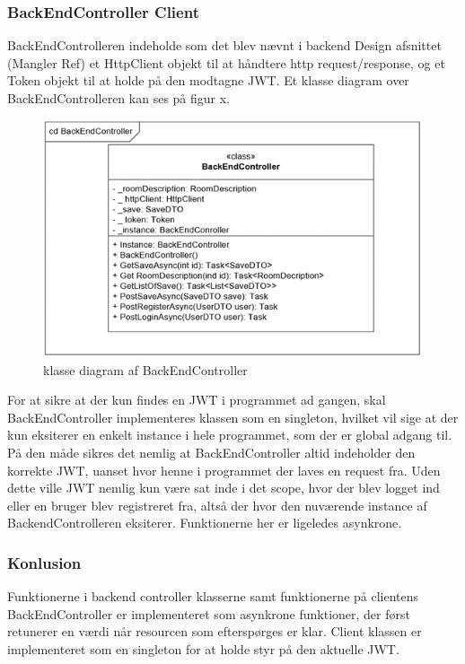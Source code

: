 \subsubsection{BackEndController Client}
BackEndControlleren indeholde som det blev nævnt i backend Design afsnittet (Mangler Ref) et HttpClient objekt til at håndtere http request/response, og et Token objekt til at holde på den modtagne JWT.
Et klasse diagram over BackEndControlleren kan ses på figur x.\\

\begin{figure}[H]
\centering
\includegraphics[width = \textwidth]{02-Body/Images/Backend_klasse_BackEndController.PNG}
\caption{klasse diagram af BackEndController}
\label{fig:Implementering-Backend-Klasse-BackEndController}
\end{figure}

For at sikre at der kun findes en JWT i programmet ad gangen, skal BackEndController implementeres klassen som en singleton, hvilket vil sige at der kun eksiterer en enkelt instance i hele programmet, som der er global adgang til. På den måde sikres det nemlig at BackEndController altid indeholder den korrekte JWT, uanset hvor henne i programmet der laves en request fra. Uden dette ville JWT nemlig kun være sat inde i det scope, hvor der blev logget ind eller en bruger blev registreret fra, altså der hvor den nuværende instance af BackendControlleren eksiterer. Funktionerne her er ligeledes asynkrone.\\


\subsubsection{Konlusion}

Funktionerne i backend controller klasserne samt funktionerne på clientens BackEndController er implementeret som asynkrone funktioner, der først retunerer en værdi når resourcen som efterspørges er klar. Client klassen er implementeret som en singleton for at holde styr på den aktuelle JWT.

\newpage
